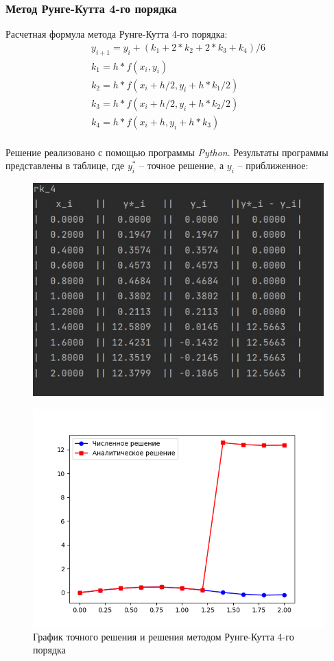 \documentclass[a4paper, 14pt, fleqn]{extarticle}
\begin{document}
			\subsubsection{Метод Рунге-Кутта 4-го порядка}
			
				Расчетная формула метода Рунге-Кутта 4-го порядка:
				\begin{multline}
					y_{i+1}=y_{i}+(k_1+2*k_2+2*k_3+k_4)/6 \\
					k_1=h*f(x_i,y_i)\\
					k_2=h*f(x_i+h/2,y_i+h*k_1/2)\\ 
					k_3=h*f(x_i+h/2,y_i+h*k_2/2)\\
					k_4=h*f(x_i+h,y_i+h*k_3)\\
				\end{multline}
				
				Решение реализовано с помощью программы \textit{Python}. Результаты программы представлены в таблице, где $y^*_i$ -- точное решение, а $y_i$ -- приближенное:
				
				\begin{figure}[h]
					\centering
					\includegraphics[width = 0.6\linewidth]{3.jpg}
				\end{figure}
			\pagebreak
			
				\begin{figure}[h]
					\centering
					\includegraphics[width = 0.6\linewidth]{rk4.png}
					\caption{График точного решения и решения методом Рунге-Кутта 4-го порядка}
				\end{figure}
			
\end{document}
